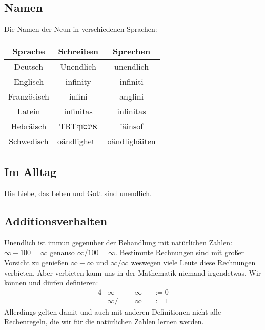 \documentclass[a4paper]{amsart}
\newcommand{\texthebrew}[1]{\bgroup\textdir TRT\hebrewfont #1\egroup}
\theoremstyle{definition}
\begin{document}
\subsection{Namen}
Die Namen der Neun in verschiedenen Sprachen:
\vspace{\kategoryVspace}

\begin{tabular}{|c|c|c|}
   \hline
   \textbf{Sprache}& \textbf{Schreiben} & \textbf{Sprechen} \\
   \hline
   Deutsch     &Unendlich   &unendlich      \\
   \hline
   Englisch    &infinity   &infiniti      \\
   \hline
   Französisch &infini   &angfini      \\
   \hline
   Latein      &infinitas  &infinitas     \\
   \hline
   Hebräisch   &\texthebrew{אינסוף}    &'äinsof \\
   \hline
   Schwedisch  &oändlighet    &oändlighäiten     \\
   \hline
\end{tabular}

\subsection{Im Alltag}
Die Liebe, das Leben und Gott sind unendlich.

\subsection{Additionsverhalten}
Unendlich ist immun gegenüber der Behandlung mit natürlichen Zahlen:
$\infty -100 = \infty$ genauso $\infty / 100 = \infty$. Bestimmte Rechnungen sind mit großer Vorsicht zu genießen $\infty - \infty$ und $\infty / \infty$ weswegen viele Leute diese Rechnungen verbieten. Aber verbieten kann uns in der Mathematik niemand irgendetwas. Wir können und dürfen definieren:
\begin{alignat}{4}
    &\infty - &&\infty &&:= 0\\
    &\infty / &&\infty &&:= 1
\end{alignat}
Allerdings gelten damit und auch mit anderen Definitionen nicht alle Rechenregeln, die wir für die natürlichen Zahlen lernen werden.
\end{document}
